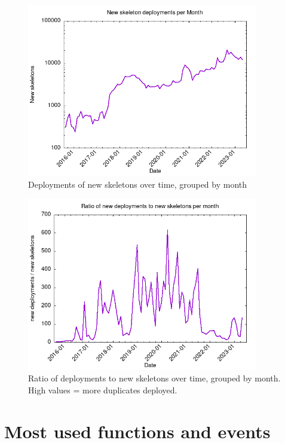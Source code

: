 \begin{figure}[H]
    \centering
    \includegraphics[width=0.9\textwidth]{Figures/analysis/skeletons_per_month.png}
    \caption{Deployments of new skeletons over time, grouped by month}
    \label{fig:skeletons-deploy}
\end{figure}

\begin{figure}[H]
    \centering
    \includegraphics[width=0.9\textwidth]{Figures/analysis/ratio_per_month.png}
    \caption{Ratio of deployments to new skeletons over time, grouped by month. High values = more duplicates deployed.}
    \label{fig:skeletons-ratio}
\end{figure}

\section{Most used functions and events}

